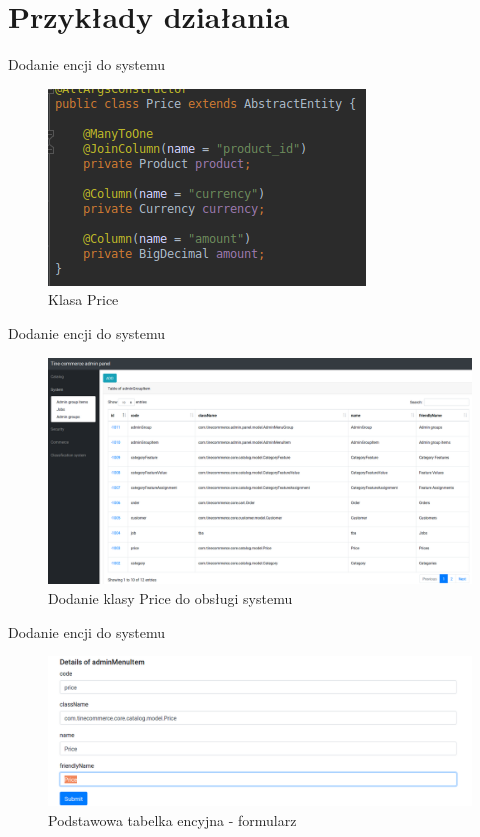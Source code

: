 \documentclass[polish,xcolor=table,9pt,aspectratio=1610,hyperref={pdfpagemode=FullScreen}]{beamer}
\begin{document}
\part{Przykłady działania}
 
\begin{frame}{Dodanie encji do systemu}
	\begin{figure}
		\begin{center}
			\includegraphics[scale=0.65]{1.png}
		\end{center}
		\caption{{\color{black}Klasa Price}}
	\end{figure}
\end{frame}

\begin{frame}{Dodanie encji do systemu}
\begin{figure}
	\begin{center}
		\includegraphics[scale=0.2]{2.png}
	\end{center}
	\caption{{\color{black}Dodanie klasy Price do obsługi systemu}} 
\end{figure}
\end{frame}

\begin{frame}{Dodanie encji do systemu}
\begin{figure}
	\begin{center}
		\includegraphics[scale=0.3]{3.png}
	\end{center}
	\caption{{\color{black}Podstawowa tabelka encyjna - formularz}} 
\end{figure}
\end{frame}
\end{document}
